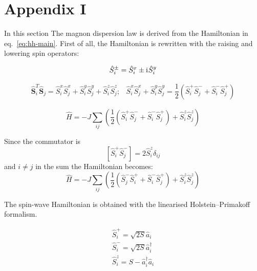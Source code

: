 \section{Appendix I}

In this section The magnon dispersion law is derived from the Hamiltonian in eq.~\eqref{eq:hh-main}.
First of all, the Hamiltonian is rewritten with the raising and lowering spin operators:

\begin{equation}
    \hat{S}_i^{\pm} = \hat{S}_i^x \pm \mathrm{i}\mkern1mu \hat{S}_i^y
\end{equation}

\begin{equation}
    \begin{matrix}
        \hat{\mathbf{S}}_i^T \hat{\mathbf{S}}_j = 
        \hat{S}_i^x \hat{S}_j^x + \hat{S}_i^y \hat{S}_j^y + \hat{S}_i^z \hat{S}_j^z; &
        \hat{S}_i^x \hat{S}_j^x + \hat{S}_i^y \hat{S}_j^y = 
        \dfrac{1}{2}\left(\hat{S}_i^+\hat{S}_j^- + \hat{S}_i^-\hat{S}_j^+\right)
    \end{matrix}
\end{equation}

\begin{equation}
    \hat{H} = -J \sum_{ij} \left(\dfrac{1}{2}\left(
        \hat{S}_i^+\hat{S}_j^- + \hat{S}_i^-\hat{S}_j^+\right) + \hat{S}_i^z \hat{S}_j^z\right)
\end{equation}

Since the commutator is 
\begin{equation}
    \left[\hat{S}_i^+\hat{S}_j^-\right] = 2\hat{S}_i^z\delta_{ij}
\end{equation}
and $i\ne j$ in the sum the Hamiltonian becomes:
\begin{equation}
    \hat{H} =-J \sum_{ij} \left(\dfrac{1}{2}\left(
            \hat{S}_j^-\hat{S}_i^+ + \hat{S}_i^-\hat{S}_j^+\right) + \hat{S}_i^z \hat{S}_j^z\right)
\end{equation}

The spin-wave Hamiltonian is obtained with the linearised Holstein–Primakoff formalism.

\begin{equation}
    \begin{matrix}
        \hat{S}_i^+ = \sqrt{2S}\hat{a}_i \\
        \hat{S}_i^- = \sqrt{2S}\hat{a}_i^{\dag} \\
        \hat{S}_i^z = S - \hat{a}_i^{\dag}\hat{a}_i
    \end{matrix}
\end{equation}


